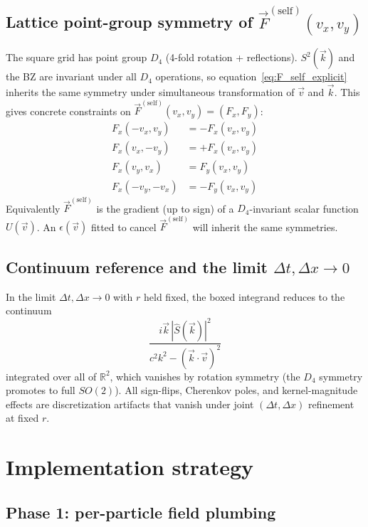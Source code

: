 \documentclass[11pt,a4paper]{article}
\begin{document}
\subsection{Lattice point-group symmetry of $\vec F^{(\mathrm{self})}(v_x, v_y)$}

The square grid has point group $D_4$ (4-fold rotation + reflections).  $S^2(\vec k)$ and the BZ are invariant under all $D_4$ operations, so equation~\ref{eq:F_self_explicit} inherits the same symmetry under simultaneous transformation of $\vec v$ and $\vec k$.  This gives concrete constraints on $\vec F^{(\mathrm{self})}(v_x, v_y) = (F_x, F_y)$:
\begin{align}
F_x(-v_x, v_y) &= -F_x(v_x, v_y) \\
F_x(v_x, -v_y) &= +F_x(v_x, v_y) \\
F_x(v_y, v_x) &= F_y(v_x, v_y) \\
F_x(-v_y, -v_x) &= -F_y(v_x, v_y)
\end{align}
Equivalently $\vec F^{(\mathrm{self})}$ is the gradient (up to sign) of a $D_4$-invariant scalar function $U(\vec v)$.  An $\epsilon(\vec v)$ fitted to cancel $\vec F^{(\mathrm{self})}$ will inherit the same symmetries.

\subsection{Continuum reference and the limit $\Delta t, \Delta x \to 0$}

In the limit $\Delta t, \Delta x \to 0$ with $r$ held fixed, the boxed integrand reduces to the continuum
\begin{equation}
\frac{i \vec k\, |\hat S(\vec k)|^2}{c^2 k^2 - (\vec k\cdot\vec v)^2}
\end{equation}
integrated over all of $\mathbb{R}^2$, which vanishes by rotation symmetry (the $D_4$ symmetry promotes to full $SO(2)$).  All sign-flips, Cherenkov poles, and kernel-magnitude effects are discretization artifacts that vanish under joint $(\Delta t, \Delta x)$ refinement at fixed $r$.

\section{Implementation strategy}

\subsection{Phase 1: per-particle field plumbing}
\end{document}
